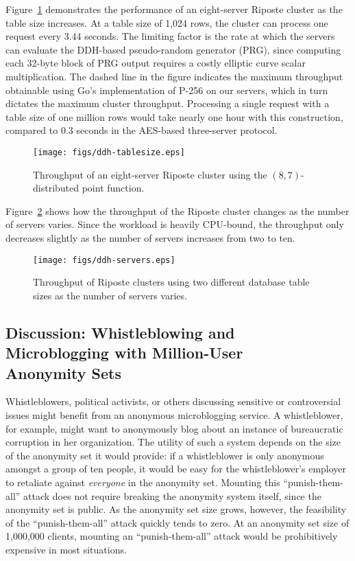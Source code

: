 \documentclass[10pt,twocolumn]{article}
\newcommand{\name}{Riposte\xspace}
\begin{document}
Figure~\ref{fig:ddh-tablesize} demonstrates the performance
of an eight-server \name cluster as the table size increases.
At a table size of 1,024 rows, the cluster can process
one request every 3.44 seconds.
The limiting factor is the rate at which the servers can evaluate
the DDH-based pseudo-random generator (PRG),
since computing each 32-byte block of PRG output requires 
a costly elliptic curve scalar multiplication.
The dashed line in the figure indicates the maximum throughput
obtainable using Go's implementation of P-256 on our servers,
which in turn dictates the maximum cluster throughput.
Processing a single request with a table size of one million
rows would take nearly one hour with this construction, compared
to 0.3 seconds in the AES-based three-server protocol.

\begin{figure}
\centering
\texttt{[image: figs/ddh-tablesize.eps]}
\caption{Throughput of an eight-server \name cluster using the 
  $(8,7)$-distributed point function.}
\label{fig:ddh-tablesize}
\end{figure}

Figure~\ref{fig:ddh-servers} shows how the throughput of the
\name cluster changes as the number of servers varies.
Since the workload is heavily CPU-bound, the throughput
only decreases slightly as the number of servers increases
from two to ten.

\begin{figure}
\centering
\texttt{[image: figs/ddh-servers.eps]}
\caption{Throughput of \name clusters using two
    different database table sizes as the number 
    of servers varies.}
\label{fig:ddh-servers}
\end{figure}


\subsection{Discussion: Whistleblowing and\\ Microblogging with Million-User\\ Anonymity Sets}
\label{sec:eval:million}

Whistleblowers, political activists,
or others discussing sensitive or controversial
issues might benefit from an anonymous microblogging service.
A whistleblower, for example, might want to anonymously blog
about an instance of bureaucratic corruption in her organization.
The utility of such a system depends on the size of the anonymity set
it would provide:
if a whistleblower is only anonymous amongst a group of ten people,
it would be easy for the whistleblower's employer to retaliate against
{\em everyone} in the anonymity set. 
Mounting this ``punish-them-all'' attack does not require breaking 
the anonymity system itself, since the anonymity set is public.
As the anonymity set size grows, however, the
feasibility of the ``punish-them-all'' attack quickly tends to zero.
At an anonymity set size of 1,000,000 clients, mounting an 
``punish-them-all'' attack would be prohibitively expensive
in most situations.
\end{document}
